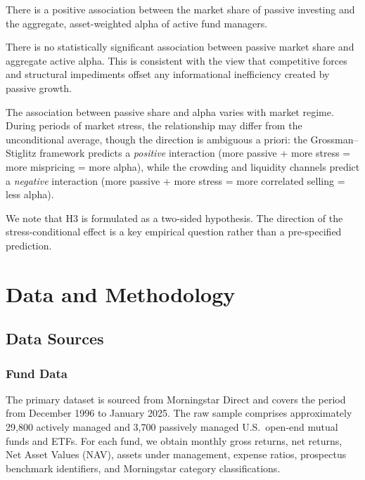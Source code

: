 \documentclass[11pt, a4paper]{article}
\begin{document}
\begin{description}[leftmargin=2cm, style=nextline]
\item[H1 (Grossman--Stiglitz):] There is a positive association between the market share of passive investing and the aggregate, asset-weighted alpha of active fund managers.
\item[H2 (Null / Berk--Green):] There is no statistically significant association between passive market share and aggregate active alpha. This is consistent with the view that competitive forces \parencite{berk2004, pastor2012, pastor2015} and structural impediments \parencite{busse2022} offset any informational inefficiency created by passive growth.
\item[H3 (Conditional):] The association between passive share and alpha varies with market regime. During periods of market stress, the relationship may differ from the unconditional average, though the direction is ambiguous a priori: the Grossman--Stiglitz framework predicts a \textit{positive} interaction (more passive + more stress = more mispricing = more alpha), while the crowding and liquidity channels \parencite{sushko2018, coles2022, hameed2010} predict a \textit{negative} interaction (more passive + more stress = more correlated selling = less alpha).
\end{description}

We note that H3 is formulated as a two-sided hypothesis. The direction of the stress-conditional effect is a key empirical question rather than a pre-specified prediction.


\section{Data and Methodology}
\label{sec:methodology}

\subsection{Data Sources}
\label{subsec:data_sources}

\subsubsection{Fund Data}

The primary dataset is sourced from Morningstar Direct and covers the period from December 1996 to January 2025. The raw sample comprises approximately 29,800 actively managed and 3,700 passively managed U.S.\ open-end mutual funds and ETFs. For each fund, we obtain monthly gross returns, net returns, Net Asset Values (NAV), assets under management, expense ratios, prospectus benchmark identifiers, and Morningstar category classifications.
\end{document}

